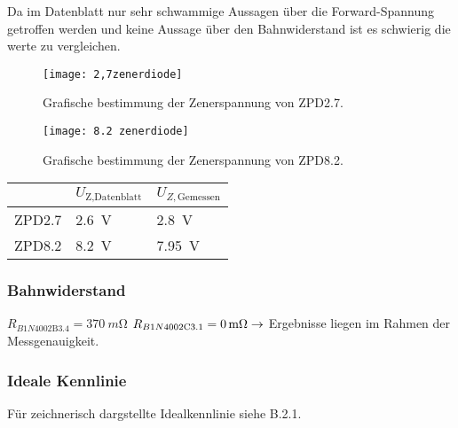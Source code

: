 \documentclass[
	a4paper, %
	12pt, %
]{CSUniSchoolLabReport}
\newcommand{\milli}{m}
\begin{document}
Da im Datenblatt nur sehr schwammige Aussagen über die Forward-Spannung getroffen werden und keine Aussage über den Bahnwiderstand ist es schwierig die werte zu vergleichen.

\begin{figure}[H] %
	\centering %
	\texttt{[image: 2,7zenerdiode]} %
	\caption{Grafische bestimmung der Zenerspannung von ZPD2.7.}
\end{figure}

\vspace{3em}

\begin{figure}[H] %
	\centering %
	\texttt{[image: 8.2 zenerdiode]} %
	\caption{Grafische bestimmung der Zenerspannung von ZPD8.2.}
\end{figure}

\begin{table}[H]
\centering
\begin{tabular}{l|ll}
                            & $U_{\text{Z,Datenblatt}}$ & $U_{Z,\text{Gemessen}}$ \\
\hline
ZPD2.7                      &\SI{2,6}{\volt}                        &\SI{2,8}{\volt}                      \\
\hline
ZPD8.2                      &\SI{8,2}{\volt}                        &\SI{7,95}{\volt}                      \\                       
\end{tabular}
\end{table}

\subsubsection{Bahnwiderstand}
$R_{B1N4002\text{B3.4}} = \SI{370}{\milli\ohm}$ \qquad\qquad $R_{B1N4002\text{C3.1}} = \SI{0}{\milli\ohm}\\\\
\rightarrow $ Ergebnisse liegen im Rahmen der Messgenauigkeit. 

\subsubsection{Ideale Kennlinie}
Für zeichnerisch dargstellte Idealkennlinie siehe B.2.1.
\end{document}

